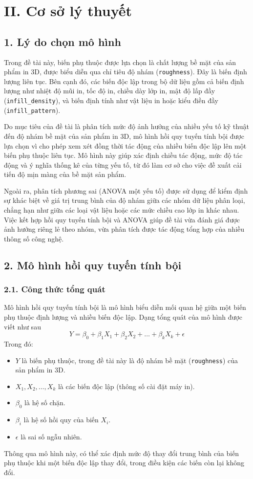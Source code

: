 \section{II. Cơ sở lý thuyết}

\subsection{1. Lý do chọn mô hình}
Trong đề tài này, biến phụ thuộc được lựa chọn là chất lượng bề mặt của sản phẩm in 3D, được biểu diễn qua chỉ tiêu độ nhám (\texttt{roughness}). Đây là biến định lượng liên tục. Bên cạnh đó, các biến độc lập trong bộ dữ liệu gồm cả biến định lượng như nhiệt độ mũi in, tốc độ in, chiều dày lớp in, mật độ lấp đầy (\texttt{infill\_density}), và biến định tính như vật liệu in hoặc kiểu điền đầy (\texttt{infill\_pattern}).

Do mục tiêu của đề tài là phân tích mức độ ảnh hưởng của nhiều yếu tố kỹ thuật đến độ nhám bề mặt của sản phẩm in 3D, mô hình hồi quy tuyến tính bội được lựa chọn vì cho phép xem xét đồng thời tác động của nhiều biến độc lập lên một biến phụ thuộc liên tục. Mô hình này giúp xác định chiều tác động, mức độ tác động và ý nghĩa thống kê của từng yếu tố, từ đó làm cơ sở cho việc đề xuất cải tiến độ mịn màng của bề mặt sản phẩm.

Ngoài ra, phân tích phương sai (ANOVA một yếu tố) được sử dụng để kiểm định sự khác biệt về giá trị trung bình của độ nhám giữa các nhóm dữ liệu phân loại, chẳng hạn như giữa các loại vật liệu hoặc các mức chiều cao lớp in khác nhau. Việc kết hợp hồi quy tuyến tính bội và ANOVA giúp đề tài vừa đánh giá được ảnh hưởng riêng lẻ theo nhóm, vừa phân tích được tác động tổng hợp của nhiều thông số công nghệ.

\subsection{2. Mô hình hồi quy tuyến tính bội}
\subsubsection{2.1. Công thức tổng quát}
Mô hình hồi quy tuyến tính bội là mô hình biểu diễn mối quan hệ giữa một biến phụ thuộc định lượng và nhiều biến độc lập. Dạng tổng quát của mô hình được viết như sau
$$Y = \beta_0 + \beta_1 X_1 + \beta_2 X_2 + \dots + \beta_k X_k + \epsilon$$
Trong đó:
\begin{itemize}
    \item $Y$ là biến phụ thuộc, trong đề tài này là độ nhám bề mặt (\texttt{roughness}) của sản phẩm in 3D.
    \item $X_1, X_2, \dots, X_k$ là các biến độc lập (thông số cài đặt máy in).
    \item $\beta_0$ là hệ số chặn.
    \item $\beta_i$ là hệ số hồi quy của biến $X_i$.
    \item $\epsilon$ là sai số ngẫu nhiên.
\end{itemize}
Thông qua mô hình này, có thể xác định mức độ thay đổi trung bình của biến phụ thuộc khi một biến độc lập thay đổi, trong điều kiện các biến còn lại không đổi.

